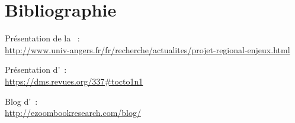 \chapter*{Bibliographie}

Présentation de la \pe\ :\\
\url{http://www.univ-angers.fr/fr/recherche/actualites/projet-regional-enjeux.html}

Présentation d'\ezb\ :\\
\url{https://dms.revues.org/337#tocto1n1}

Blog d'\ezb\ :\\
\url{http://ezoombookresearch.com/blog/}

